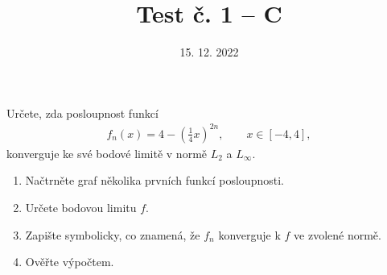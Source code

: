 \documentclass{article}
\begin{document}
\title{Test č. 1 -- C}
\date{15. 12. 2022}
\author{}
\maketitle


\noindent
Určete, zda posloupnost funkcí
\begin{align*}
        f_n(x) = 4-\left( \frac{1}{4}x \right)^{2n}, \qquad x\in[-4,4],
\end{align*}
konverguje ke své bodové limitě v normě $L_2$ a $L_\infty$.

\vspace{2cm}

\begin{enumerate}
\item Načtrněte graf několika prvních funkcí posloupnosti.
\item Určete bodovou limitu $f$.
\item Zapište symbolicky, co znamená, že $f_n$ konverguje k $f$ ve zvolené normě.
\item Ověřte výpočtem.
\end{enumerate}
\end{document}
